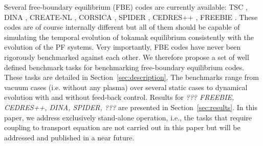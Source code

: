 Several free-boundary equilibrium (FBE) codes are currently available: TSC \cite{TSCref}, DINA \cite{DINA1993}, CREATE-NL \cite{CREATEref}, CORSICA \cite{CORSICAref}, SPIDER \cite{SPIDERref}, CEDRES++ \cite{CEDRESref}, FREEBIE \cite{FREEBIERef}. These codes are of course internally different but all of them should be capable of simulating the temporal evolution of tokamak equilibrium consistently with the evolution of the PF systems. Very importantly, FBE codes have never been rigorously benchmarked against each other. We therefore propose a set of well defined benchmark tasks for benchmarking free-boundary equilibrium codes. These tasks are detailed in Section~\ref{sec:description}. The benchmarks range from vacuum cases (i.e. without any plasma) over several static cases to dynamical evolution with and without feed-back control. Results for \emph{??? FREEBIE, CEDRES++, DINA, SPIDER, ???} are presented in Section~\ref{sec:results}. In this paper, we address exclusively stand-alone operation, i.e., the tasks that require coupling to transport equation are not carried out in this paper but will be addressed and published in a near future.



